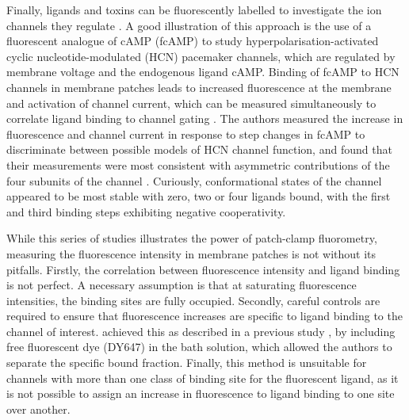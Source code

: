 Finally, ligands and toxins can be fluorescently labelled to investigate the ion channels they regulate \cite{zheng_handbook_2015, braun_current_2020}.
A good illustration of this approach is the use of a fluorescent analogue of cAMP (fcAMP) to study hyperpolarisation-activated cyclic nucleotide-modulated (HCN) pacemaker channels, which are regulated by membrane voltage and the endogenous ligand cAMP.
Binding of fcAMP to HCN channels in membrane patches leads to increased fluorescence at the membrane and activation of channel current, which can be measured simultaneously to correlate ligand binding to channel gating \cite{kusch_interdependence_2010-1, kusch_how_2012, thon_conformational_2015}.
The authors measured the increase in fluorescence and channel current in response to step changes in fcAMP to discriminate between possible models of HCN channel function, and found that their measurements were most consistent with asymmetric contributions of the four subunits of the channel \cite{kusch_how_2012}.
Curiously, conformational states of the channel appeared to be most stable with zero, two or four ligands bound, with the first and third binding steps exhibiting negative cooperativity.

While this series of studies illustrates the power of patch-clamp fluorometry, measuring the fluorescence intensity in membrane patches is not without its pitfalls.
Firstly, the correlation between fluorescence intensity and ligand binding is not perfect.
A necessary assumption is that at saturating fluorescence intensities, the binding sites are fully occupied.
Secondly, careful controls are required to ensure that fluorescence increases are specific to ligand binding to the channel of interest.
\textcite{kusch_interdependence_2010-1} achieved this as described in a previous study \cite{biskup_relating_2007}, by including free fluorescent dye (DY647) in the bath solution, which allowed the authors to separate the specific bound fraction.
Finally, this method is unsuitable for channels with more than one class of binding site for the fluorescent ligand, as it is not possible to assign an increase in fluorescence to ligand binding to one site over another.


